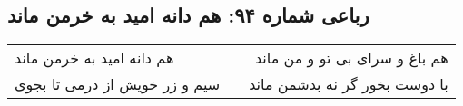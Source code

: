 \begin{center}
\section*{رباعی شماره ۹۴: هم دانه امید به خرمن ماند}
\label{sec:sh094}
\begin{longtable}{l p{0.5cm} r}
هم دانه امید به خرمن ماند
&&
هم باغ و سرای بی تو و من ماند
\\
سیم و زر خویش از درمی تا بجوی
&&
با دوست بخور گر نه بدشمن ماند
\\
\end{longtable}
\end{center}
